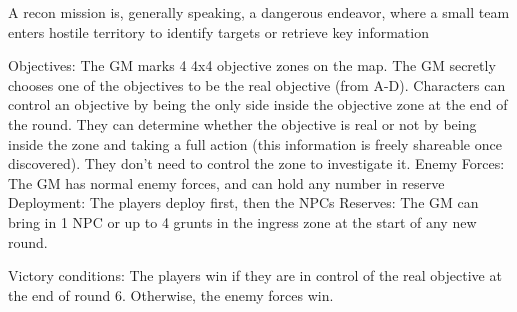 A recon mission is, generally speaking, a dangerous endeavor, where a small team enters hostile  
territory to identify targets or retrieve key information  

Objectives: The GM marks 4 4x4 objective zones on the map. The GM secretly chooses one of  
the objectives to be the real objective (from A-D). Characters can control an objective by being the  
only side inside the objective zone at the end of the round. They can determine whether the  
objective is real or not by being inside the zone and taking a full action (this information is freely  
shareable once discovered). They don’t need to control the zone to investigate it.  
Enemy Forces: The GM has normal enemy forces, and can hold any number in reserve  
Deployment: The players deploy first, then the NPCs  
Reserves: The GM can bring in 1 NPC or up to 4 grunts in the ingress zone at the start of any  
new round.  

                                                                                                                        


Victory conditions: The players win if they are in control of the real objective at the end of round  
6. Otherwise, the enemy forces win.  

                                                                                                          
